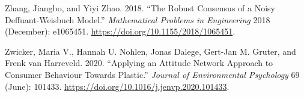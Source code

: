 \documentclass[
  a4paper,
  DIV=11,
  numbers=noendperiod,
  oneside]{scrreprt}
\newlength{\cslhangindent}
\newenvironment{CSLReferences}[2] %
 {\begin{list}{}{%
  \setlength{\itemindent}{0pt}
  \setlength{\leftmargin}{0pt}
  \setlength{\parsep}{0pt}
  \ifodd #1
   \setlength{\leftmargin}{\cslhangindent}
   \setlength{\itemindent}{-1\cslhangindent}
  \fi
  \setlength{\itemsep}{#2\baselineskip}}}
 {\end{list}}
\begin{document}
\begin{CSLReferences}{1}{0}
Zhang, Jiangbo, and Yiyi Zhao. 2018. {``The {Robust Consensus} of a
{Noisy Deffuant-Weisbuch Model}.''} \emph{Mathematical Problems in
Engineering} 2018 (December): e1065451.
\url{https://doi.org/10.1155/2018/1065451}.

Zwicker, Maria V., Hannah U. Nohlen, Jonas Dalege, Gert-Jan M. Gruter,
and Frenk van Harreveld. 2020. {``Applying an Attitude Network Approach
to Consumer Behaviour Towards Plastic.''} \emph{Journal of Environmental
Psychology} 69 (June): 101433.
\url{https://doi.org/10.1016/j.jenvp.2020.101433}.

\end{CSLReferences}



\printindex
\end{document}
